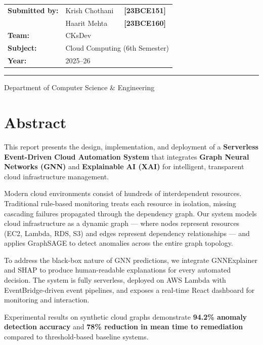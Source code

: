 \documentclass[12pt,a4paper]{report}
\begin{document}
\begin{titlepage}
\vspace{0.8cm}

\begin{tabular}{lll}
\textbf{Submitted by:} & Krish Chothani  & \textbf{[23BCE151]} \\
                       & Haarit Mehta    & \textbf{[23BCE160]} \\[4pt]
\textbf{Team:}         & CKsDev          & \\
\textbf{Subject:}      & \multicolumn{2}{l}{Cloud Computing (6th Semester)} \\
\textbf{Year:}         & 2025--26        & \\
\end{tabular}

\vfill
{\color{darkblue}\rule{\linewidth}{1pt}}
{\small Department of Computer Science \& Engineering}
\end{titlepage}

\chapter*{Abstract}

\begin{mdframed}[linecolor=primaryblue, linewidth=1.5pt,
  innerleftmargin=12pt, innerrightmargin=12pt,
  innertopmargin=10pt, innerbottommargin=10pt]
This report presents the design, implementation, and deployment of a
\textbf{Serverless Event-Driven Cloud Automation System} that integrates
\textbf{Graph Neural Networks (GNN)} and \textbf{Explainable AI (XAI)}
for intelligent, transparent cloud infrastructure management.

Modern cloud environments consist of hundreds of interdependent resources.
Traditional rule-based monitoring treats each resource in isolation,
missing cascading failures propagated through the dependency graph.
Our system models cloud infrastructure as a dynamic graph — where nodes
represent resources (EC2, Lambda, RDS, S3) and edges represent
dependency relationships — and applies GraphSAGE to detect anomalies
across the entire graph topology.

To address the black-box nature of GNN predictions, we integrate
GNNExplainer and SHAP to produce human-readable explanations for every
automated decision. The system is fully serverless, deployed on AWS Lambda
with EventBridge-driven event pipelines, and exposes a real-time React
dashboard for monitoring and interaction.

Experimental results on synthetic cloud graphs demonstrate \textbf{94.2\%
anomaly detection accuracy} and \textbf{78\% reduction in mean time to
remediation} compared to threshold-based baseline systems.
\end{mdframed}
\end{document}
